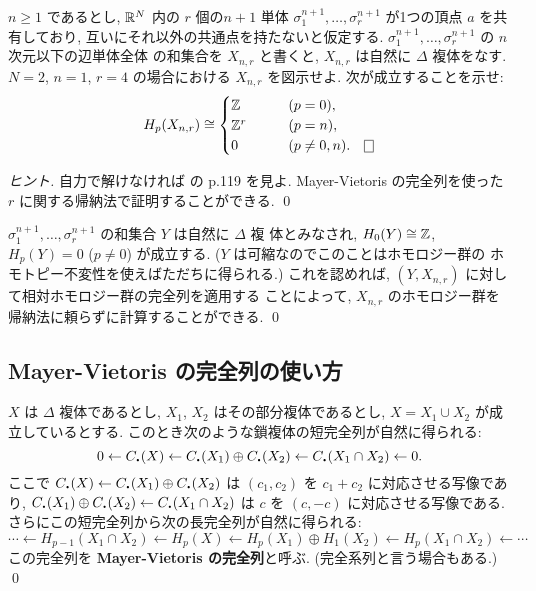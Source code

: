 \documentclass[12pt,twoside]{jarticle}
\begin{document}
\begin{question}\qstar{*}
  $n \ge 1$ であるとし, %
  ${\mathbb R}^N$ 内の $r$ 個の$n+1$ 単体 %
  $\sigma^{n+1}_1,\dots,\sigma^{n+1}_r$ が1つの頂点 $a$ を共有しており,
  互いにそれ以外の共通点を持たないと仮定する. 
  $\sigma^{n+1}_1,\dots,\sigma^{n+1}_r$ の $n$ 次元以下の辺単体全体
  の和集合を $X_{n,r}$ と書くと, $X_{n,r}$ は自然に $\Delta$ 複体をなす. 
  $N=2$, $n=1$, $r=4$ の場合における $X_{n,r}$ を図示せよ.
  次が成立することを示せ:
  \[
    H_p(X_{n,r}) \isom
    \begin{cases}
      \Z   & \qquad (p = 0), \\
      \Z^r & \qquad (p = n), \\
      0    & \qquad (p \ne 0,n).
      \qed
    \end{cases}
  \]
\end{question}

\begin{proof}[ヒント]
 自力で解けなければ \cite{Tamura} の p.119 を見よ.
 Mayer-Vietoris の完全列を使った $r$ に関する帰納法で証明することができる. 
 \qed
\end{proof}

\begin{guide}
 $\sigma^{n+1}_1,\dots,\sigma^{n+1}_r$ の和集合 $Y$ は自然に $\Delta$ 複
 体とみなされ, $H_0(Y)\cong{\mathbb Z}$, $H_p(Y)=0$ ($p\ne 0$) が成立する. 
 ($Y$ は可縮なのでこのことはホモロジー群の
 ホモトピー不変性を使えばただちに得られる.) 
 これを認めれば, $(Y, X_{n,r})$ に対して相対ホモロジー群の完全列を適用する
 ことによって, $X_{n,r}$ のホモロジー群を帰納法に頼らずに計算することができる.
 \qed
\end{guide}


\subsection{Mayer-Vietoris の完全列の使い方}

\begin{theorem}
  $X$ は $\Delta$ 複体であるとし, $X_1$, $X_2$ はその部分複体であるとし,
  $X = X_1 \cup X_2$ が成立しているとする. 
  このとき次のような鎖複体の短完全列が自然に得られる:
  \begin{equation*}
    0
    \leftarrow C_\bcdot(X)
    \leftarrow C_\bcdot(X_1)\oplus C_\bcdot(X_2)
    \leftarrow C_\bcdot(X_1\cap X_2)
    \leftarrow 0.
  \end{equation*}
  ここで $C_\bcdot(X)\leftarrow C_\bcdot(X_1)\oplus C_\bcdot(X_2)$ 
  は $(c_1, c_2)$ を $c_1+c_2$ に対応させる写像であり, %
  $C_\bcdot(X_1)\oplus C_\bcdot(X_2) \leftarrow C_\bcdot(X_1\cap X_2)$
  は $c$ を $(c,-c)$ に対応させる写像である.
  さらにこの短完全列から次の長完全列が自然に得られる:
  \begin{equation*}
    \cdots
    \leftarrow H_{p-1}(X_1\cap X_2)
    \leftarrow H_p(X)
    \leftarrow H_p(X_1)\oplus H_1(X_2)
    \leftarrow H_p(X_1\cap X_2)
    \leftarrow \cdots
  \end{equation*}
  この完全列を {\bf Mayer-Vietoris の完全列}と呼ぶ.
  (完全系列と言う場合もある.)
  \qed
\end{theorem}
\end{document}
